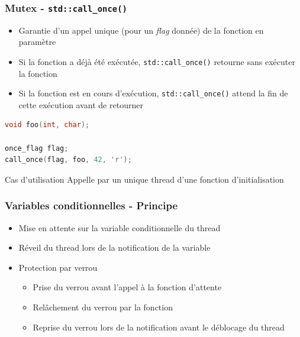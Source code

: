 \documentclass[C++.tex]{subfiles}
\begin{document}
\begin{frame}[fragile]
	\frametitle{Mutex - \lstinline|std::call_once()|}
	\begin{itemize}
		\item Garantie d'un appel unique (pour un \textit{flag} donnée) de la fonction en paramètre
		\item Si la fonction a déjà été exécutée, \lstinline|std::call_once()| retourne sans exécuter la fonction
		\item Si la fonction est en cours d'exécution, \lstinline|std::call_once()| attend la fin de cette exécution avant de retourner
	\end{itemize}

	\begin{lstlisting}[language=C++]
void foo(int, char);

once_flag flag;
call_once(flag, foo, 42, 'r');\end{lstlisting}

	\begin{block}{Cas d'utilisation}
		Appelle par un unique thread d'une fonction d'initialisation
	\end{block}
\end{frame}

\begin{frame}[fragile]
	\frametitle{Variables conditionnelles - Principe}
	\begin{itemize}
		\item Mise en attente sur la variable conditionnelle du thread
		\item Réveil du thread lors de la notification de la variable
		\item Protection par verrou
		\begin{itemize}
			\item Prise du verrou avant l'appel à la fonction d'attente
			\item Relâchement du verrou par la fonction
			\item Reprise du verrou lors de la notification avant le déblocage du thread
		\end{itemize}
	\end{itemize}
\end{frame}
\end{document}
